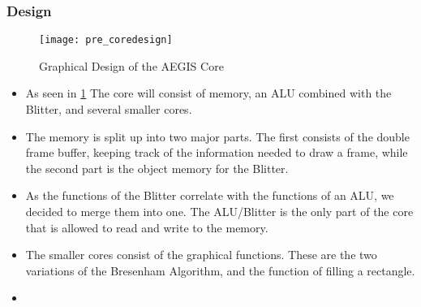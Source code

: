 \subsubsection*{Design}

\begin{figure}[H]
	\caption{Graphical Design of the AEGIS Core}
	\centering
	\texttt{[image: pre\_coredesign]}
	\label{img:coredes}
\end{figure}

\begin{itemize}
	\item As seen in \cref{img:coredes} The core will consist of memory, an ALU combined with the Blitter, and several smaller cores.
	\item The memory is split up into two major parts. The first consists of the double frame buffer, keeping track of the information needed to draw a frame, while the second part is the object memory for the Blitter.
	\item As the functions of the Blitter correlate with the functions of an ALU, we decided to merge them into one. The ALU/Blitter is the only part of the core that is allowed to read and write to the memory.
	\item The smaller cores consist of the graphical functions. These are the two variations of the Bresenham Algorithm, and the function of filling a rectangle.
	\item 
\end{itemize}
